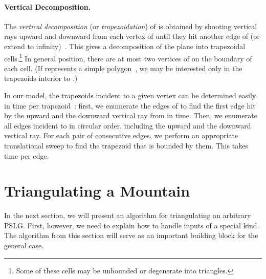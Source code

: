 \documentclass[11pt,a4paper]{article}
\newcommand{\Histogram}{Mountain}
\newcommand{\pslg}{PSLG}
\begin{document}
\paragraph{Vertical Decomposition.}
The \emph{vertical
decomposition} (or \emph{trapezoidation}) of  is
obtained by shooting vertical rays upward and downward from each vertex
of  until they hit another edge of  (or extend to
infinity)~\cite{deBergChvKrOv08}.
This gives a decomposition of the plane into trapezoidal cells.\footnote{Some
of these cells may be unbounded or degenerate into triangles.}
In general position, there are at most two vertices of  on the
boundary of each cell.
(If  represents a simple polygon~, we may be interested
only in the trapezoids interior to .)

In our model,
the trapezoids
incident to a given vertex 
can be determined easily in 
time per trapezoid~\cite{AsanoMuRoWa11,AsanoMuWa11}: first, we enumerate
the edges of  to find the first edge hit by the upward
and the downward vertical ray from  in  time. Then,
we enumerate all edges incident to  in circular order, including the
upward and the downward vertical ray. For each pair of consecutive edges, we perform an appropriate
translational sweep to find the trapezoid that is bounded by them. This takes  time per
edge.



\section{Triangulating a \Histogram{}}
\label{sec:hist}

In the next section, we will present an algorithm for
triangulating an arbitrary \pslg. First, however,
we need to explain how to handle inputs of a special kind.
The algorithm from this section will serve as an important building
block for the general case.
\end{document}
